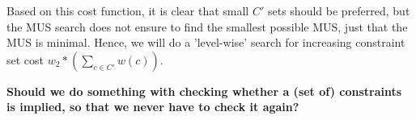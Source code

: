Based on this cost function, it is clear that small $C'$ sets should be preferred, but the MUS search does not ensure to find the smallest possible MUS, just that the MUS is minimal. Hence, we will do a 'level-wise' search for increasing constraint set cost $w_2*(\sum_{c \in C'} w(c))$.

\textbf{Should we do something with checking whether a (set of) constraints is implied, so that we never have to check it again?}


%
%
%	
%
%
%
%

